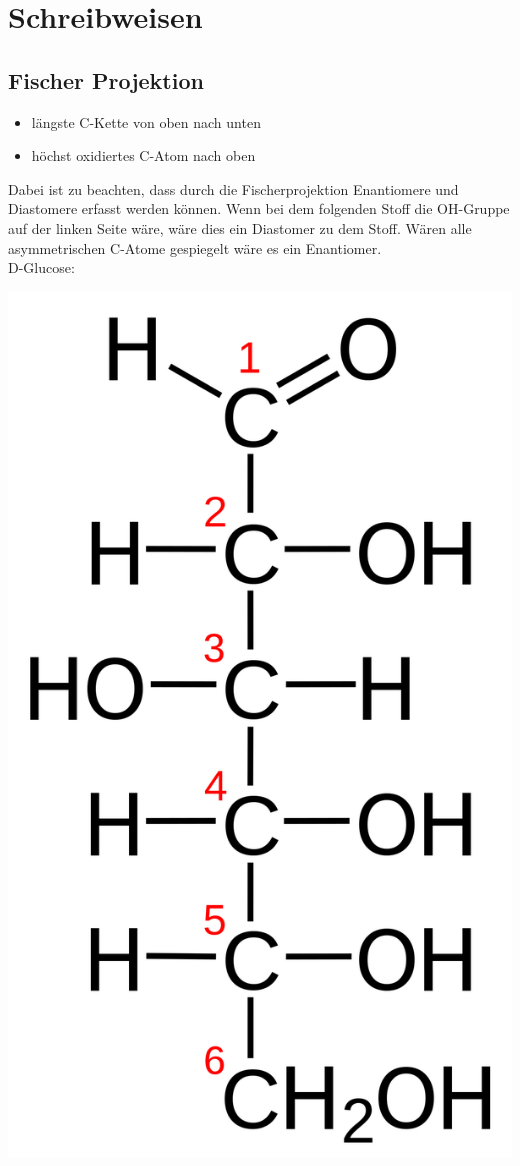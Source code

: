 \section{Schreibweisen}

\subsection{Fischer Projektion}
\label{sec:fischer}
\begin{itemize}
    \item längste C-Kette von oben nach unten
    \item höchst oxidiertes C-Atom nach oben
\end{itemize}

Dabei ist zu beachten, dass durch die Fischerprojektion Enantiomere und Diastomere erfasst werden können. 
Wenn bei dem folgenden Stoff die OH-Gruppe auf der linken Seite wäre, wäre dies ein Diastomer zu dem Stoff. 
Wären alle asymmetrischen C-Atome gespiegelt wäre es ein Enantiomer. \\
D-Glucose:

\includegraphics[scale=0.06]{media/naturstoffe/fischer.png}

